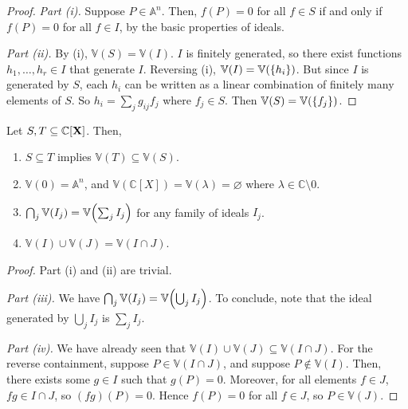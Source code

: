 \begin{proof}
    \emph{Part (i).}
    Suppose \( P \in \mathbb A^n \).
    Then, \( f(P) = 0 \) for all \( f \in S \) if and only if \( f(P) = 0 \) for all \( f \in I \), by the basic properties of ideals.

    \emph{Part (ii).}
    By (i), \( \mathbb V(S) = \mathbb V(I) \).
    \( I \) is finitely generated, so there exist functions \( h_1, \dots, h_r \in I \) that generate \( I \).
    Reversing (i), \( \mathbb V(I) = \mathbb V(\qty{h_i}) \).
    But since \( I \) is generated by \( S \), each \( h_i \) can be written as a linear combination of finitely many elements of \( S \).
    So \( h_i = \sum_j g_{ij} f_j \) where \( f_j \in S \).
    Then \( \mathbb V(S) = \mathbb V(\qty{f_j}) \).
\end{proof}
\begin{proposition}
    Let \( S, T \subseteq \mathbb C[\vb X] \).
    Then,
    \begin{enumerate}
        \item \( S \subseteq T \) implies \( \mathbb V(T) \subseteq \mathbb V(S) \).
        \item \( \mathbb V(0) = \mathbb A^n \), and \( \mathbb V(\mathbb C[X]) = \mathbb V(\lambda) = \varnothing \) where \( \lambda \in \mathbb C \setminus \qty{0} \).
        \item \( \bigcap_j \mathbb V(I_j) = \mathbb V\qty(\sum_j I_j) \) for any family of ideals \( I_j \).
        \item \( \mathbb V(I) \cup \mathbb V(J) = \mathbb V(I \cap J) \).
    \end{enumerate}
\end{proposition}
\begin{proof}
    Part (i) and (ii) are trivial.

    \emph{Part (iii).}
    We have \( \bigcap_j \mathbb V(I_j) = \mathbb V\qty(\bigcup_j I_j) \).
    To conclude, note that the ideal generated by \( \bigcup_j I_j \) is \( \sum_j I_j \).

    \emph{Part (iv).}
    We have already seen that \( \mathbb V(I) \cup \mathbb V(J) \subseteq \mathbb V(I \cap J) \).
    For the reverse containment, suppose \( P \in \mathbb V(I \cap J) \), and suppose \( P \not\in \mathbb V(I) \).
    Then, there exists some \( g \in I \) such that \( g(P) = 0 \).
    Moreover, for all elements \( f \in J \), \( fg \in I \cap J \), so \( (fg)(P) = 0 \).
    Hence \( f(P) = 0 \) for all \( f \in J \), so \( P \in \mathbb V(J) \).
\end{proof}

